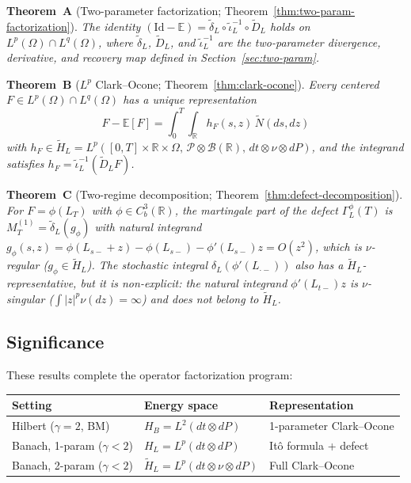 \documentclass[11pt,a4paper]{article}
\theoremstyle{plain}
\theoremstyle{definition}
\theoremstyle{remark}
\newcommand{\Id}{\mathrm{Id}}
\newcommand{\E}{\mathbb{E}}
\newcommand{\R}{\mathbb{R}}
\begin{document}
\medskip\noindent
\textbf{Theorem~A} (Two-parameter factorization;
Theorem~\ref{thm:two-param-factorization}).
\emph{The identity
$(\Id - \E) = \widetilde{\delta}_L \circ
\widetilde{\iota}_L^{-1} \circ \widetilde{D}_L$
holds on $L^p(\Omega) \cap L^q(\Omega)$, where
$\widetilde{\delta}_L$, $\widetilde{D}_L$, and
$\widetilde{\iota}_L^{-1}$ are the two-parameter divergence,
derivative, and recovery map defined in
Section~\ref{sec:two-param}.}

\medskip\noindent
\textbf{Theorem~B} ($L^p$ Clark--Ocone;
Theorem~\ref{thm:clark-ocone}).
\emph{Every centered $F \in L^p(\Omega) \cap L^q(\Omega)$ has a
unique representation}
\[
  F - \E[F]
  = \int_0^T\!\!\int_{\R} h_F(s,z)\,\widetilde{N}(ds,dz)
\]
\emph{with $h_F \in \widetilde{H}_L
= L^p([0,T]\times\R\times\Omega,\,
\mathcal{P}\otimes\mathcal{B}(\R),\,dt\otimes\nu\otimes dP)$,
and the integrand satisfies
$h_F = \widetilde{\iota}_L^{-1}(\widetilde{D}_L F)$.}

\medskip\noindent
\textbf{Theorem~C} (Two-regime decomposition;
Theorem~\ref{thm:defect-decomposition}).
\emph{For $F = \phi(L_T)$ with $\phi \in C_b^3(\R)$, the
martingale part of the defect $\Gamma_L^{\phi}(T)$ is
$M_T^{(1)} = \widetilde{\delta}_L(g_\phi)$ with natural
integrand
$g_\phi(s,z) = \phi(L_{s-}+z) - \phi(L_{s-}) - \phi'(L_{s-})z
= O(z^2)$, which is $\nu$-regular
($g_\phi \in \widetilde{H}_L$).  The stochastic integral
$\delta_L(\phi'(L_{\cdot-}))$ also has a
$\widetilde{H}_L$-representative, but it is non-explicit:
the natural integrand $\phi'(L_{t-})z$ is $\nu$-singular
($\int|z|^p\nu(dz) = \infty$) and does not belong to
$\widetilde{H}_L$.}


\subsection{Significance}

These results complete the operator factorization program:

\begin{center}
\begin{tabular}{lll}
\textbf{Setting} & \textbf{Energy space} & \textbf{Representation} \\
\hline
Hilbert ($\gamma = 2$, BM)
  & $H_B = L^2(dt \otimes dP)$
  & 1-parameter Clark--Ocone \\
Banach, 1-param ($\gamma < 2$)
  & $H_L = L^p(dt \otimes dP)$
  & It\^o formula + defect \\
Banach, 2-param ($\gamma < 2$)
  & $\widetilde{H}_L = L^p(dt \otimes \nu \otimes dP)$
  & Full Clark--Ocone
\end{tabular}
\end{center}
\end{document}
